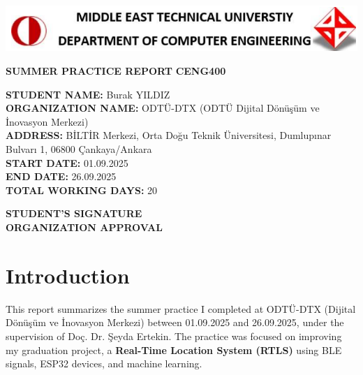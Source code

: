 \documentclass[a4paper,12pt]{report}
\begin{document}
\begin{titlepage}
    \centering
    \includegraphics[width=1\textwidth]{figures/cover_image.png} %
    
    \vspace*{1cm}
    \Huge \textbf{SUMMER PRACTICE REPORT}
    \vspace{1.5cm}
    \LARGE \textbf{CENG400}
    
    \vfill
    \RaggedRight
    \large
    \textbf{STUDENT NAME:} Burak YILDIZ \\
    \textbf{ORGANIZATION NAME:} ODTÜ-DTX (ODTÜ Dijital Dönüşüm ve İnovasyon Merkezi) \\
    \textbf{ADDRESS:} BİLTİR Merkezi, Orta Doğu Teknik Üniversitesi, Dumlupınar Bulvarı 1, 06800 Çankaya/Ankara \\
    \textbf{START DATE:} 01.09.2025 \\
    \textbf{END DATE:} 26.09.2025 \\
    \textbf{TOTAL WORKING DAYS:} 20 \\
    \vfill

    \begin{multicols}{2}
        \raggedright \textbf{STUDENT’S SIGNATURE} \\
        \raggedleft \textbf{ORGANIZATION APPROVAL}
    \end{multicols}
    \vfill
\end{titlepage}

\tableofcontents
\newpage

\chapter{Introduction}
This report summarizes the summer practice I completed at ODTÜ-DTX (Dijital Dönüşüm ve İnovasyon Merkezi) between 01.09.2025 and 26.09.2025, under the supervision of Doç. Dr. Şeyda Ertekin.  
The practice was focused on improving my graduation project, a \textbf{Real-Time Location System (RTLS)} using BLE signals, ESP32 devices, and machine learning.  
\end{document}
